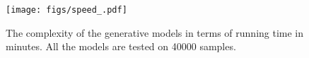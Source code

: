 \begin{figure}[h]
     \centering
     \texttt{[image: figs/speed\_.pdf]}
     \caption{The complexity of the generative models in terms of running time in minutes. All the models are tested on \num{40000} samples.}
     \label{fig:speed}
 \end{figure}
